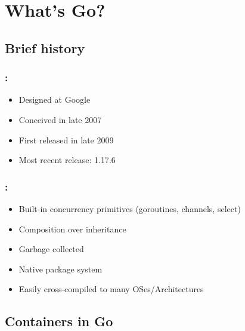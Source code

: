 \section{What's Go?}

\subsection{Brief history}

\begin{frame}
    \frametitle{\secname: \small\subsecname\normalsize}

    \begin{itemize}
        \item Designed at Google
        \item Conceived in late 2007
        \item First released in late 2009
        \item Most recent release: 1.17.6
    \end{itemize}

\end{frame}

\begin{frame}
    \frametitle{\secname: \small\subsecname\normalsize}

    \begin{itemize}
        \item Built-in concurrency primitives (goroutines, channels, select)
        \item Composition over inheritance
        \item Garbage collected
        \item Native package system
        \item Easily cross-compiled to many OSes/Architectures
    \end{itemize}

\end{frame}

\subsection{Containers in Go}

